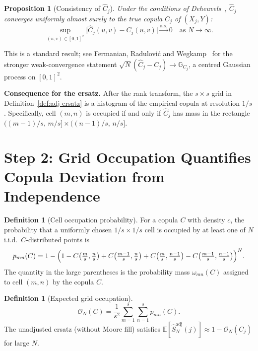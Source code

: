 \documentclass[11pt,a4paper]{article}
\newtheorem{proposition}[theorem]{Proposition}
\theoremstyle{definition}
\newtheorem{definition}[theorem]{Definition}
\newcommand{\E}{\mathbb{E}}
\begin{document}
\begin{proposition}[Consistency of $\hat{C}_j$]
\label{prop:copula-consistency}
Under the conditions of Deheuvels~\cite{deheuvels1979}, $\hat{C}_j$ converges uniformly
almost surely to the true copula $C_j$ of $(X_j, Y)$:
\[
  \sup_{(u,v)\in[0,1]^2} \bigl|\hat{C}_j(u,v) - C_j(u,v)\bigr|
  \xrightarrow{\mathrm{a.s.}} 0 \quad \text{as } N \to \infty.
\]
\end{proposition}

This is a standard result; see Fermanian, Radulović and Wegkamp~\cite{fermanian2004} for
the stronger weak-convergence statement $\sqrt{N}(\hat{C}_j - C_j) \to
\mathbb{G}_{C_j}$, a centred Gaussian process on $[0,1]^2$.

\medskip
\textbf{Consequence for the ersatz.}  After the rank transform, the
$s \times s$ grid in Definition~\ref{def:adj-ersatz} is a histogram of the
empirical copula at resolution $1/s$.  Specifically, cell $(m,n)$ is
occupied if and only if $\hat{C}_j$ has mass in the rectangle
$\bigl((m-1)/s,\, m/s\bigr] \times \bigl((n-1)/s,\, n/s\bigr]$.

\section{Step 2: Grid Occupation Quantifies Copula Deviation from Independence}

\begin{definition}[Cell occupation probability]
For a copula $C$ with density $c$, the probability that a uniformly chosen
$1/s \times 1/s$ cell is occupied by at least one of $N$ i.i.d.\
$C$-distributed points is
\[
  p_{mn}(C)
  = 1 - \Bigl(1 - C\bigl(\tfrac{m}{s}, \tfrac{n}{s}\bigr)
              + C\bigl(\tfrac{m-1}{s}, \tfrac{n}{s}\bigr)
              + C\bigl(\tfrac{m}{s}, \tfrac{n-1}{s}\bigr)
              - C\bigl(\tfrac{m-1}{s}, \tfrac{n-1}{s}\bigr)\Bigr)^N.
\]
The quantity in the large parentheses is the probability mass
$\omega_{mn}(C)$ assigned to cell $(m,n)$ by the copula $C$.
\end{definition}

\begin{definition}[Expected grid occupation]
\[
  \mathcal{O}_N(C)
  = \frac{1}{s^2}\sum_{m=1}^s\sum_{n=1}^s p_{mn}(C).
\]
The unadjusted ersatz (without Moore fill) satisfies
$\E[\hat{S}^{\mathrm{adj}}_N(j)] \approx 1 - \mathcal{O}_N(C_j)$ for large $N$.
\end{definition}
\end{document}
